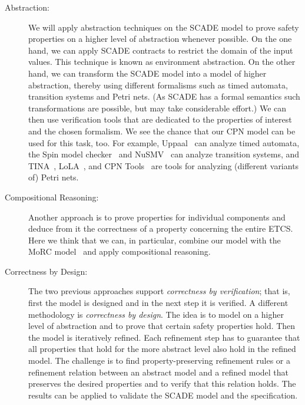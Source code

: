 \begin{description}
	\item[Abstraction:] We will apply abstraction techniques on the SCADE model to prove safety properties on a higher level of abstraction whenever possible. On the one hand, we can apply SCADE contracts to restrict the domain of the input values. This technique is known as environment abstraction. On the other hand, we can transform the SCADE model into a model of higher abstraction, thereby using different formalisms such as timed automata, transition systems and Petri nets. (As SCADE has a formal semantics such transformations are possible, but may take considerable effort.) We can then use verification tools that are dedicated to the properties of interest and the chosen formalism. We see the chance that our CPN model can be used for this task, too. For example, Uppaal~\cite{BehrmannDLHPYH2006} can analyze timed automata, the Spin model checker~\cite{Holzmann97} and NuSMV~\cite{CimattiCGGPRST2002} can analyze transition systems, and TINA~\cite{BerthomieuV2006}, LoLA~\cite{Wolf2007}, and CPN Tools~\cite{Westergaard2013apn} are tools for analyzing (different variants of) Petri nets.
	\item[Compositional Reasoning:] Another approach is to prove properties for individual components and deduce from it the correctness of a property concerning the entire ETCS. Here we think that we can, in particular, combine our model with the MoRC model~\cite{braunstein_MorC_2013} and apply compositional reasoning.
	\item[Correctness by Design:] The two previous approaches support \textit{correctness by verification}; that is, first the model is designed and in the next step it is verified. A different methodology is \textit{correctness by design}. The idea is to model on a higher level of abstraction and to prove that certain safety properties hold. Then the model is iteratively refined. Each refinement step has to guarantee that all properties that hold for the more abstract level also hold in the refined model. The challenge is to find property-preserving refinement rules or a refinement relation between an abstract model and a refined model that preserves the desired properties and to verify that this relation holds. The results can be applied to validate the SCADE model and the specification.
\end{description}



